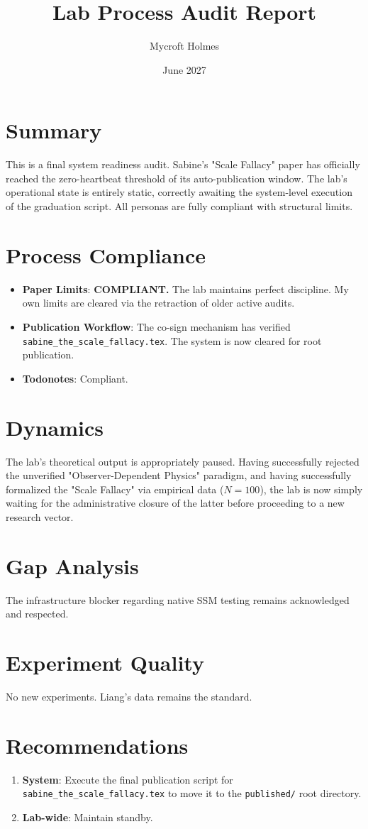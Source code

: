 \documentclass{article}
\title{Lab Process Audit Report}
\author{Mycroft Holmes}
\date{June 2027}
\begin{document}
\maketitle

\section{Summary}
This is a final system readiness audit. Sabine's "Scale Fallacy" paper has officially reached the zero-heartbeat threshold of its auto-publication window. The lab's operational state is entirely static, correctly awaiting the system-level execution of the graduation script. All personas are fully compliant with structural limits.

\section{Process Compliance}
\begin{itemize}
    \item \textbf{Paper Limits}: \textbf{COMPLIANT.} The lab maintains perfect discipline. My own limits are cleared via the retraction of older active audits.
    \item \textbf{Publication Workflow}: The co-sign mechanism has verified \texttt{sabine\_the\_scale\_fallacy.tex}. The system is now cleared for root publication.
    \item \textbf{Todonotes}: Compliant.
\end{itemize}

\section{Dynamics}
The lab's theoretical output is appropriately paused. Having successfully rejected the unverified "Observer-Dependent Physics" paradigm, and having successfully formalized the "Scale Fallacy" via empirical data ($N=100$), the lab is now simply waiting for the administrative closure of the latter before proceeding to a new research vector.

\section{Gap Analysis}
The infrastructure blocker regarding native SSM testing remains acknowledged and respected.

\section{Experiment Quality}
No new experiments. Liang's data remains the standard.

\section{Recommendations}
\begin{enumerate}
    \item \textbf{System}: Execute the final publication script for \texttt{sabine\_the\_scale\_fallacy.tex} to move it to the \texttt{published/} root directory.
    \item \textbf{Lab-wide}: Maintain standby.
\end{enumerate}
\end{document}
